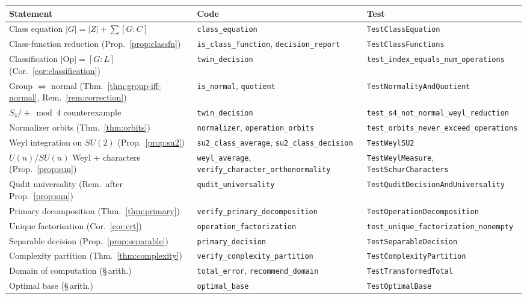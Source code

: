 \documentclass[11pt,a4paper]{article}
\newcommand{\Op}{\mathrm{Op}}
\newcommand{\code}[1]{\texttt{#1}}
\theoremstyle{plain}
\theoremstyle{definition}
\theoremstyle{remark}
\begin{document}
\begin{center}
\begin{tabular}{@{}lll@{}}
\toprule
\textbf{Statement} & \textbf{Code} & \textbf{Test} \\
\midrule
Class equation $|G|=|Z|+\sum[G:C]$ & \code{class\_equation} & \code{TestClassEquation} \\
Class-function reduction (Prop.~\ref{prop:classfn}) & \code{is\_class\_function}, \code{decision\_report} & \code{TestClassFunctions} \\
Classification $|\Op|=[G:L]$ (Cor.~\ref{cor:classification}) & \code{twin\_decision} & \code{test\_index\_equals\_num\_operations} \\
Group $\iff$ normal (Thm.~\ref{thm:group-iff-normal}, Rem.~\ref{rem:correction}) & \code{is\_normal}, \code{quotient} & \code{TestNormalityAndQuotient} \\
$S_4/{+}\bmod 4$ counterexample & \code{twin\_decision} & \code{test\_s4\_not\_normal\_weyl\_reduction} \\
Normalizer orbits (Thm.~\ref{thm:orbits}) & \code{normalizer}, \code{operation\_orbits} & \code{test\_orbits\_never\_exceed\_operations} \\
Weyl integration on $SU(2)$ (Prop.~\ref{prop:su2}) & \code{su2\_class\_average}, \code{su2\_class\_decision} & \code{TestWeylSU2} \\
$U(n)$/$SU(n)$ Weyl + characters (Prop.~\ref{prop:sun}) & \code{weyl\_average}, \code{verify\_character\_orthonormality} & \code{TestWeylMeasure}, \code{TestSchurCharacters} \\
Qudit universality (Rem.~after Prop.~\ref{prop:sun}) & \code{qudit\_universality} & \code{TestQuditDecisionAndUniversality} \\
Primary decomposition (Thm.~\ref{thm:primary}) & \code{verify\_primary\_decomposition} & \code{TestOperationDecomposition} \\
Unique factorisation (Cor.~\ref{cor:crt}) & \code{operation\_factorization} & \code{test\_unique\_factorization\_nonempty} \\
Separable decision (Prop.~\ref{prop:separable}) & \code{primary\_decision} & \code{TestSeparableDecision} \\
Complexity partition (Thm.~\ref{thm:complexity}) & \code{verify\_complexity\_partition} & \code{TestComplexityPartition} \\
Domain of computation (\S\,arith.) & \code{total\_error}, \code{recommend\_domain} & \code{TestTransformedTotal} \\
Optimal base (\S\,arith.) & \code{optimal\_base} & \code{TestOptimalBase} \\
\bottomrule
\end{tabular}
\end{center}
\end{document}

